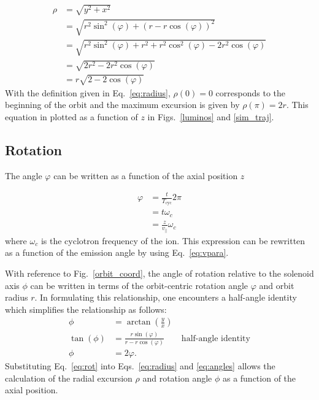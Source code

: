 \begin{equation}
\begin{split}
\rho&=\sqrt{y^2+x^2}\\
&=\sqrt{r^2\sin^2(\varphi)+(r-r\cos(\varphi))^2}\\
&=\sqrt{r^2\sin^2(\varphi)+r^2+r^2\cos^2(\varphi)-2r^2\cos(\varphi)}\\
&=\sqrt{2r^2-2r^2\cos(\varphi)}\\
&=r\sqrt{2-2\cos(\varphi)}
\end{split}
\label{eq:radius}
\end{equation}
With the definition given in Eq.~\ref{eq:radius}, $\rho(0)=0$ corresponds to the beginning of the orbit and the maximum excursion is given by $\rho(\pi)=2r$.  This equation in plotted as a function of $z$ in Figs.~\ref{luminos} and \ref{sim_traj}.

\subsection{Rotation}
The angle $\varphi$ can be written as a function of the axial position $z$

\begin{equation}
\begin{split}
\varphi&=\frac{t}{T_\mathrm{cyc}}2\pi\\
&=t\omega_c\\
&=\frac{z}{v_\parallel}\omega_c
\end{split}
\label{eq:rot}
\end{equation}
where $\omega_c$ is the cyclotron frequency of the ion.  This expression can be %
rewritten as a function of the emission angle by using Eq.~\ref{eq:vpara}.

With reference to Fig.~\ref{orbit_coord}, the angle of rotation relative to the solenoid axis $\phi$ can be written in terms of the orbit-centric rotation angle $\varphi$ and orbit radius $r$.  In formulating this relationship, one encounters a half-angle identity which simplifies the relationship as follows:
\begin{equation}
\begin{split}
\phi&=\arctan \left(\frac{y}{x}\right)\\
\tan(\phi)&=\frac{r\sin(\varphi)}{r-r\cos(\varphi)} \qquad \textrm{half-angle identity}\\
\phi&=2\varphi. 
\end{split}
\label{eq:angles}
\end{equation}
Substituting Eq.~\ref{eq:rot} into Eqs.~\ref{eq:radius} and \ref{eq:angles} allows the calculation of the radial excursion $\rho$ and rotation angle $\phi$ as a function of the axial position. 

